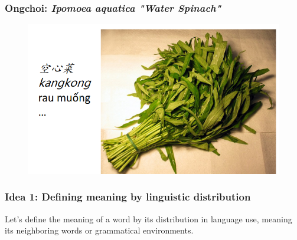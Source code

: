 \documentclass[13.5pt,aspecratio=169, xcolor=dvipsnames]{beamer}
\begin{document}
\begin{frame}
\onehalfspacing
    \frametitle{Ongchoi: \textit{Ipomoea aquatica "Water Spinach"}}
    \begin{figure}[h]
        \centering
        \includegraphics[width=\linewidth]{ongchoi.png}
    \end{figure}
\end{frame}

\begin{frame}
    \onehalfspacing
        \frametitle{Idea 1: Defining meaning by linguistic distribution}
        {\Large
        Let's define the meaning of a word by its
distribution in language use, meaning its
neighboring words or grammatical environments.
        }
    \end{frame}
\end{document}
